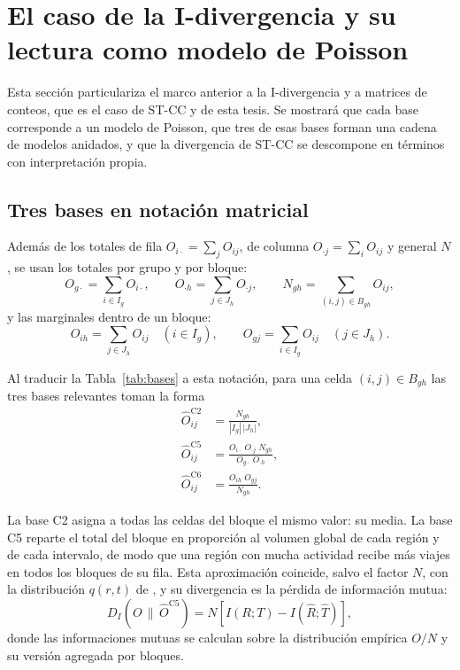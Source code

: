 \section{El caso de la I-divergencia y su lectura como modelo de Poisson}\label{sec:idiv-poisson}

Esta sección particulariza el marco anterior a la I-divergencia y a matrices de
conteos, que es el caso de ST-CC y de esta tesis. Se mostrará que cada base
corresponde a un modelo de Poisson, que tres de esas bases forman una cadena de
modelos anidados, y que la divergencia de ST-CC se descompone en términos con
interpretación propia.

\subsection{Tres bases en notación matricial}

Además de los totales de fila $O_{i\cdot} = \sum_j O_{ij}$, de columna
$O_{\cdot j} = \sum_i O_{ij}$ y general $N$, se usan los totales por grupo y por
bloque:
\[
  O_{g\cdot} = \sum_{i \in I_g} O_{i\cdot}, \qquad
  O_{\cdot h} = \sum_{j \in J_h} O_{\cdot j}, \qquad
  N_{gh} = \sum_{(i,j) \in B_{gh}} O_{ij},
\]
y las marginales dentro de un bloque:
\[
  O_{ih} = \sum_{j \in J_h} O_{ij} \quad (i \in I_g), \qquad
  O_{gj} = \sum_{i \in I_g} O_{ij} \quad (j \in J_h).
\]

Al traducir la Tabla~\ref{tab:bases} a esta notación, para una celda
$(i,j) \in B_{gh}$ las tres bases relevantes toman la forma
\begin{align}
  \hat{O}^{\mathrm{C2}}_{ij} &= \frac{N_{gh}}{|I_g|\,|J_h|}, \label{eq:c2}\\[4pt]
  \hat{O}^{\mathrm{C5}}_{ij} &= \frac{O_{i\cdot}\; O_{\cdot j}\; N_{gh}}{O_{g\cdot}\; O_{\cdot h}}, \label{eq:c5}\\[4pt]
  \hat{O}^{\mathrm{C6}}_{ij} &= \frac{O_{ih}\; O_{gj}}{N_{gh}}. \label{eq:c6}
\end{align}

La base C2 asigna a todas las celdas del bloque el mismo valor: su media. La base
C5 reparte el total del bloque en proporción al volumen global de cada región y de
cada intervalo, de modo que una región con mucha actividad recibe más viajes en
todos los bloques de su fila. Esta aproximación coincide, salvo el factor $N$, con
la distribución $q(r,t)$ de \cite{Dhillon2003}, y su divergencia es la pérdida de información
mutua:
\begin{equation}\label{eq:perdida-im}
  D_I\!\left(O \,\|\, \hat{O}^{\mathrm{C5}}\right) = N \left[ I(R;T) - I(\hat{R};\hat{T}) \right],
\end{equation}
donde las informaciones mutuas se calculan sobre la distribución empírica $O/N$ y
su versión agregada por bloques.

